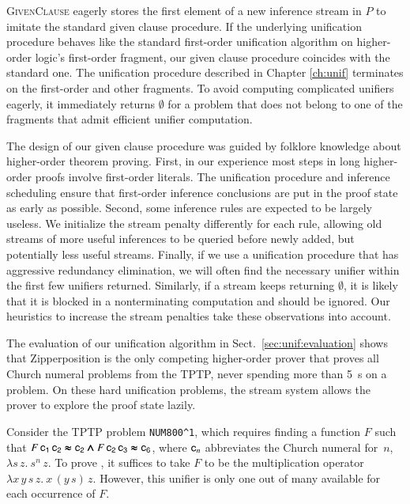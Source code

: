 \textsc{GivenClause} eagerly stores the first element of a new inference stream
in $P$ to imitate the standard given clause procedure. If the underlying
unification procedure behaves like the standard first-order unification
algorithm on higher-order logic's first-order fragment, our given clause
procedure coincides with the standard one. The unification procedure described in Chapter \ref{ch:unif}
terminates on the first-order and other fragments. To avoid computing
complicated unifiers eagerly, it immediately returns $\emptyset$ for a problem that does not
belong to one of the fragments that admit efficient unifier computation.


The design of our given clause procedure was guided by folklore knowledge about
higher-order theorem proving. First, in our experience most steps in
long higher-order proofs involve first-order literals. The unification
procedure and inference scheduling ensure that first-order inference
conclusions are put in the proof state as early as possible. Second, some
inference rules are expected to be largely useless. We initialize the stream
penalty differently for each rule, allowing old streams of more useful
inferences to be queried before newly added, but potentially less useful
streams. Finally, if we use a unification procedure that has aggressive
redundancy elimination, we will often find the necessary unifier within the
first few unifiers returned. Similarly, if a stream keeps returning
$\emptyset$, it is likely that it is blocked in a nonterminating computation
and should be ignored. Our heuristics to increase the stream penalties take
these observations into account.


\begin{sloppypar}
  
  The evaluation of our unification algorithm in Sect.~\ref{sec:unif:evaluation}
  shows that Zipperposition is the only competing
  higher-order prover that proves all Church numeral problems from the TPTP,
  never spending more than 5~s on a problem. On these hard
  unification problems, the stream system allows the prover to explore the proof
  state lazily.
\end{sloppypar}

Consider the TPTP problem \verb|NUM800^1|, which requires finding
a function $F$ such that $F \, \mathsf{c_1} \, \mathsf{c_2}
\pmb{\approx} \mathsf{c_2} \pmb{\land} F \, \mathsf{c_2} \, \mathsf{c_3} \pmb{\approx} \mathsf{c_6}$, where
$\mathsf{c}_n$ abbreviates the Church numeral for~$n$, $\lambda s\, z. \>
s^n \, z$. To prove
, it suffices to take $F$ to be the multiplication operator
$\lambda x \, y \, s \, z. \> x \, (y \, s) \, z$.
However, this unifier is only one out of many available for each occurrence of
$F$.

